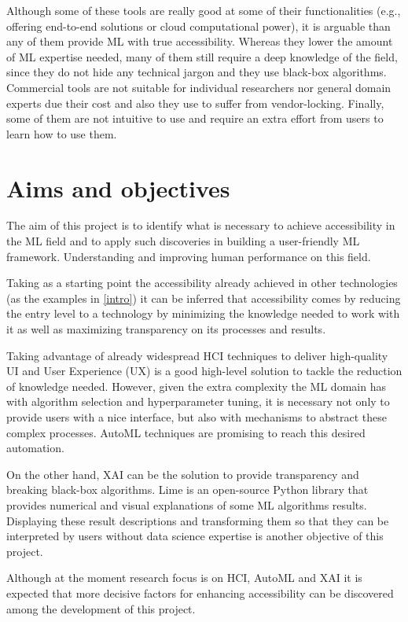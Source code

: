 \documentclass[runningheads]{llncs}
\begin{document}
Although some of these tools are really good at some of their functionalities (e.g., offering end-to-end solutions or cloud computational power), it is arguable than any of them provide ML with true accessibility. Whereas they lower the amount of ML expertise needed, many of them still require a deep knowledge of the field, since they do not hide any technical jargon and they use black-box algorithms. Commercial tools are not suitable for individual researchers nor general domain experts due their cost and also they use to suffer from vendor-locking. Finally, some of them are not intuitive to use and require an extra effort from users to learn how to use them.

\section{Aims and objectives}

The aim of this project is to identify what is necessary to achieve accessibility in the ML field and to apply such discoveries in building a user-friendly ML framework. Understanding and improving human performance on this field. 

Taking as a starting point the accessibility already achieved in other technologies (as the examples in \ref{intro}) it can be inferred that accessibility comes by reducing the entry level to a technology by minimizing the knowledge needed to work with it as well as maximizing transparency on its processes and results. 

Taking advantage of already widespread HCI techniques to deliver high-quality UI and User Experience (UX) is a good high-level solution to tackle the reduction of knowledge needed.  However, given the extra complexity the ML domain has with algorithm selection and hyperparameter tuning, it is necessary not only to provide users with a nice interface, but also with mechanisms to abstract these complex processes. AutoML techniques are promising to reach this desired automation.

On the other hand, XAI can be the solution to provide transparency and breaking black-box algorithms. Lime \cite{lime} is an open-source Python library that provides numerical and visual explanations of some ML algorithms results. Displaying these result descriptions and transforming them so that they can be interpreted by users without data science expertise is another objective of this project.

Although at the moment research focus is on HCI, AutoML and XAI it is expected that more decisive factors for enhancing accessibility can be discovered among the development of this project. 
\end{document}
